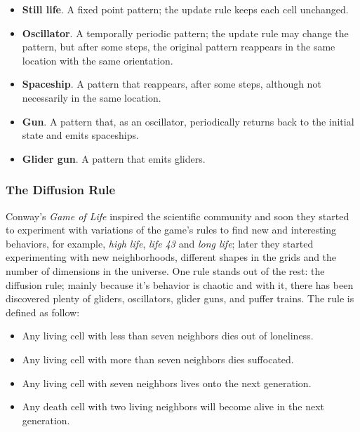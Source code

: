 \begin{itemize}
  \item \textbf{Still life}. A fixed point pattern; the update rule keeps each
    cell unchanged.
  \item \textbf{Oscillator}. A temporally periodic pattern; the update rule may
    change the pattern, but after some steps, the original pattern reappears in
    the same location with the same orientation.
  \item \textbf{Spaceship}. A pattern that reappears, after some steps, although
    not necessarily in the same location.
  \item \textbf{Gun}. A pattern that, as an oscillator, periodically returns
    back to the initial state and emits spaceships.
  \item \textbf{Glider gun}. A pattern that emits gliders.
\end{itemize}

\subsubsection{The Diffusion Rule}
Conway's \textit{Game of Life} inspired the scientific  community and soon they
started to experiment with variations of the game's rules to find new and
interesting behaviors, for example, \textit{high life}, \textit{life 43} and
\textit{long life}; later they started experimenting with new neighborhoods,
different shapes in the grids and the number  of dimensions in the universe. One
rule stands out of the rest: the diffusion rule; mainly because it's behavior
is chaotic and with it, there has been discovered plenty of gliders,
oscillators, glider guns, and puffer trains. The rule is defined as follow:
\begin{itemize}
  \item Any living cell with less than seven neighbors dies out of loneliness.
  \item Any living cell with more than seven neighbors dies suffocated.
  \item Any living cell with seven neighbors lives onto the next generation.
  \item Any death cell with two living neighbors will become alive in the next generation.
\end{itemize}
